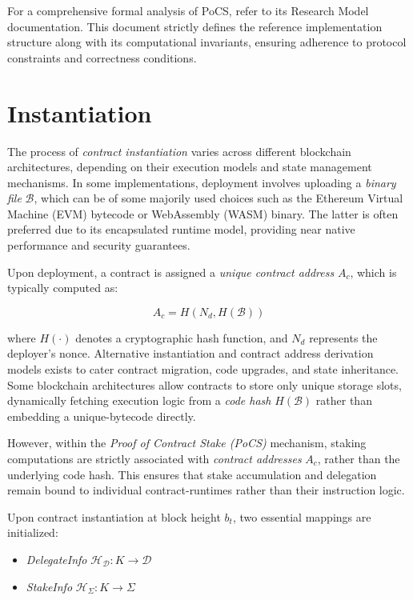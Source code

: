 \documentclass{article}
\begin{document}
For a comprehensive formal analysis of PoCS, refer to its Research Model documentation. This document strictly defines the reference implementation structure along with its computational invariants, ensuring adherence to protocol constraints and correctness conditions.


\section{Instantiation}

The process of \textit{contract instantiation} varies across different blockchain architectures, depending on their execution models and state management mechanisms. In some implementations, deployment involves uploading a \textit{binary file} \( \mathcal{B} \), which can be of some majorily used choices such as the Ethereum Virtual Machine (EVM) bytecode or WebAssembly (WASM) binary. The latter is often preferred due to its encapsulated runtime model, providing near native performance and security guarantees. 

Upon deployment, a contract is assigned a \textit{unique contract address} \( A_c \), which is typically computed as:

\begin{equation}
A_c = H(N_d, H(\mathcal{B}))
\end{equation}

where \( H(\cdot) \) denotes a cryptographic hash function, and \( N_d \) represents the deployer’s nonce. Alternative instantiation and contract address derivation models exists to cater contract migration, code upgrades, and state inheritance. Some blockchain architectures allow contracts to store only unique storage slots, dynamically fetching execution logic from a \textit{code hash} \( H(\mathcal{B}) \) rather than embedding a unique-bytecode directly.

However, within the \textit{Proof of Contract Stake (PoCS)} mechanism, staking computations are strictly associated with \textit{contract addresses} \( A_c \), rather than the underlying code hash. This ensures that stake accumulation and delegation remain bound to individual contract-runtimes rather than their instruction logic.

Upon contract instantiation at block height \( b_t \), two essential mappings are initialized:

\begin{itemize}
    \item \textit{DelegateInfo} \( \mathcal{H}_\mathcal{D}: K \to \mathcal{D} \)
    \item \textit{StakeInfo} \( \mathcal{H}_{\Sigma}: K \to \Sigma \)
\end{itemize}
\end{document}
